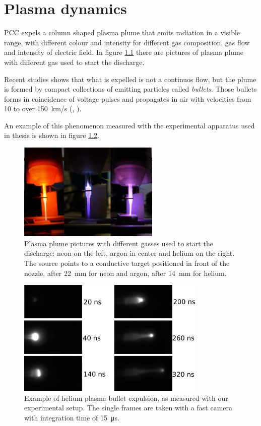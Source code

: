 \chapter{Plasma dynamics}
\label{ch:shape}
PCC expels a column shaped plasma plume that emits radiation in a visible range, with different colour and intensity for different gas composition, gas flow and intensity of electric field. In figure \ref{fig:pl_picture} there are pictures of plasma plume with different gas used to start the discharge.

Recent studies shows that what is expelled is not a continuos flow, but the plume is formed by compact collections of emitting particles called \emph{bullets}. Those bullets forms in coincidence of voltage pulses and propagates in air with velocities from \num{10} to over \SI{150}{\kilo\meter/\second} (\cite{Mericam_Bourdet_2009}, \cite{doi:10.1002/ppap.200900078}).

An example of this phenomenon measured with the experimental apparatus used in thesis is shown in figure \ref{fig:pl_bullet}.
\begin{figure}
 \centering
 \includegraphics[width = 0.6\textwidth]{Images/Shape/plasmapic.png}
 \caption{Plasma plume pictures with different gasses used to start the discharge: neon on the left, argon in center and helium on the right. The source points to a conductive target positioned in front of the nozzle, after \SI{22}{\milli\meter} for neon and argon, after \SI{14}{\milli\meter} for helium.}
 \label{fig:pl_picture}
\end{figure}
\begin{figure}
 \centering
 \includegraphics[width=0.8\textwidth]{Images/Shape/frames.png}
 \caption{Example of helium plasma bullet expulsion, as measured with our experimental setup. The single frames are taken with a fast camera with integration time of \SI{15}{\micro\second}.}
 \label{fig:pl_bullet}
\end{figure}

